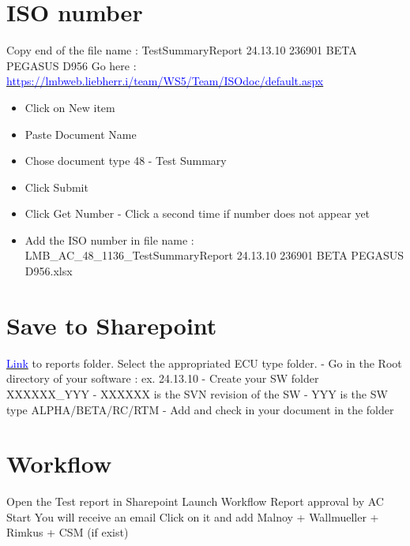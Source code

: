 \section{ISO number}
Copy end of the file name : TestSummaryReport 24.13.10 236901 BETA PEGASUS D956\newline
Go here : \href{https://lmbweb.liebherr.i/team/WS5/Team/ISOdoc/default.aspx}{\textcolor{blue}{https://lmbweb.liebherr.i/team/WS5/Team/ISOdoc/default.aspx}}
\begin{itemize} 
\item Click on New item
\item Paste Document Name
\item Chose document type 48 - Test Summary
\item Click Submit
\item Click Get Number - Click a second time if number does not appear yet
\item Add the ISO number in file name : LMB\_AC\_48\_1136\_TestSummaryReport 24.13.10 236901 BETA PEGASUS D956.xlsx
\end{itemize} 

\clearpage


\section{Save to Sharepoint}
\href{https://lmbweb.liebherr.i/team/WS5/Team/Release/Hil\%20Test\%20Reports/Forms/AllItems.aspx}{\textcolor{blue}{Link}} to reports folder.\newline
Select the appropriated ECU type folder.\newline
- Go in the Root directory of your software : ex. 24.13.10\newline
- Create your SW folder XXXXXX\_YYY\newline
- XXXXXX is the SVN revision of the SW\newline
- YYY is the SW type ALPHA/BETA/RC/RTM\newline
- Add and check in your document in the folder\newline

\clearpage


\section{Workflow}
Open the Test report in Sharepoint\newline
Launch Workflow \textrightarrow Report approval by AC \textrightarrow  Start\newline
You will receive an email\newline
Click on it and add Malnoy + Wallmueller + Rimkus + CSM (if exist)\newline


\clearpage